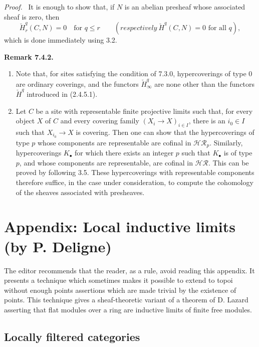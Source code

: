 \documentclass[11pt]{article}
\newcommand{\resp}{respectively}
\newcommand{\sheaf}[1]{\mathcal{#1}}
\newcommand{\clH}[2]{\check H_{#1}^{#2}}
\newcommand{\clHi}[1]{\check H_{\infty}^{#1}}
\newcommand{\clHall}[1]{\check H^{#1}}
\newenvironment{remarktext}[1]{\par\medskip\noindent\textbf{#1.}\ }{\par\medskip}
\newenvironment{prooftext}{\par\noindent\emph{Proof.}\ }{\par\medskip}
\begin{document}
\begin{prooftext}
It is enough to show that, if $N$ is an abelian presheaf whose associated sheaf is zero, then
\[
        \clH{r}{q}(C,N)=0\quad\text{for }q\leq r
        \qquad(\resp\ \clHall{q}(C,N)=0\text{ for all }q),
\]
which is done immediately using 3.2.
\end{prooftext}

\begin{remarktext}{Remark 7.4.2}
\begin{enumerate}[label=\arabic*)]
\item Note that, for sites satisfying the condition of 7.3.0, hypercoverings of type $0$ are ordinary coverings, and the functors $\clHi{q}$ are none other than the functors $\check H^q$ introduced in (2.4.5.1).
\item Let $C$ be a site with representable finite projective limits such that, for every object $X$ of $C$ and every covering family $(X_i\to X)_{i\in I}$, there is an $i_0\in I$ such that $X_{i_0}\to X$ is covering. Then one can show that the hypercoverings of type $p$ whose components are representable are cofinal in $\sheaf{HR}_p$. Similarly, hypercoverings $K_\bullet$ for which there exists an integer $p$ such that $K_\bullet$ is of type $p$, and whose components are representable, are cofinal in $\sheaf{HR}$. This can be proved by following 3.5. These hypercoverings with representable components therefore suffice, in the case under consideration, to compute the cohomology of the sheaves associated with presheaves.
\end{enumerate}
\end{remarktext}


\section{Appendix: Local inductive limits (by P. Deligne)}

The editor recommends that the reader, as a rule, avoid reading this appendix. It presents a technique which sometimes makes it possible to extend to topoi without enough points assertions which are made trivial by the existence of points. This technique gives a sheaf-theoretic variant of a theorem of D. Lazard asserting that flat modules over a ring are inductive limits of finite free modules.

\subsection{Locally filtered categories}
\end{document}
